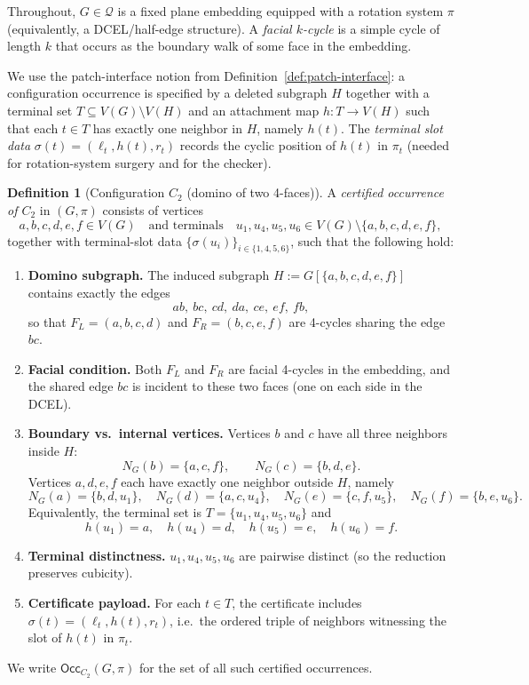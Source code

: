 \documentclass[12pt]{article}
\theoremstyle{definition}
\newtheorem{definition}[theorem]{Definition}
\begin{document}
Throughout, $G\in\mathcal Q$ is a fixed plane embedding equipped with a rotation
system $\pi$ (equivalently, a DCEL/half-edge structure).
A \emph{facial $k$-cycle} is a simple cycle of length $k$ that occurs as the boundary
walk of some face in the embedding.

We use the patch-interface notion from Definition~\ref{def:patch-interface}:
a configuration occurrence is specified by a deleted subgraph $H$ together with
a terminal set $T\subseteq V(G)\setminus V(H)$ and an attachment map
$h:T\to V(H)$ such that each $t\in T$ has exactly one neighbor in $H$, namely $h(t)$.
The \emph{terminal slot data} $\sigma(t)=(\ell_t,h(t),r_t)$ records the cyclic position of
$h(t)$ in $\pi_t$ (needed for rotation-system surgery and for the checker).

\medskip

\begin{definition}[Configuration $C_2$ (domino of two 4-faces)]
\label{def:C2-occ}
A \emph{certified occurrence of $C_2$} in $(G,\pi)$ consists of vertices
\[
a,b,c,d,e,f\in V(G)\quad\text{and terminals}\quad u_1,u_4,u_5,u_6\in V(G)\setminus\{a,b,c,d,e,f\},
\]
together with terminal-slot data $\{\sigma(u_i)\}_{i\in\{1,4,5,6\}}$,
such that the following hold:

\begin{enumerate}
\item \textbf{Domino subgraph.}
The induced subgraph $H:=G[\{a,b,c,d,e,f\}]$ contains exactly the edges
\[
ab,\ bc,\ cd,\ da,\ ce,\ ef,\ fb,
\]
so that $F_L=(a,b,c,d)$ and $F_R=(b,c,e,f)$ are 4-cycles sharing the edge $bc$.

\item \textbf{Facial condition.}
Both $F_L$ and $F_R$ are facial 4-cycles in the embedding, and the shared edge
$bc$ is incident to these two faces (one on each side in the DCEL).

\item \textbf{Boundary vs.\ internal vertices.}
Vertices $b$ and $c$ have all three neighbors inside $H$:
\[
N_G(b)=\{a,c,f\},\qquad N_G(c)=\{b,d,e\}.
\]
Vertices $a,d,e,f$ each have exactly one neighbor outside $H$, namely
\[
N_G(a)=\{b,d,u_1\},\quad N_G(d)=\{a,c,u_4\},\quad N_G(e)=\{c,f,u_5\},\quad N_G(f)=\{b,e,u_6\}.
\]
Equivalently, the terminal set is $T=\{u_1,u_4,u_5,u_6\}$ and
\[
h(u_1)=a,\quad h(u_4)=d,\quad h(u_5)=e,\quad h(u_6)=f.
\]

\item \textbf{Terminal distinctness.}
$u_1,u_4,u_5,u_6$ are pairwise distinct (so the reduction preserves cubicity).

\item \textbf{Certificate payload.}
For each $t\in T$, the certificate includes $\sigma(t)=(\ell_t,h(t),r_t)$,
i.e.\ the ordered triple of neighbors witnessing the slot of $h(t)$ in $\pi_t$.
\end{enumerate}

We write $\mathsf{Occ}_{C_2}(G,\pi)$ for the set of all such certified occurrences.
\end{definition}
\end{document}
